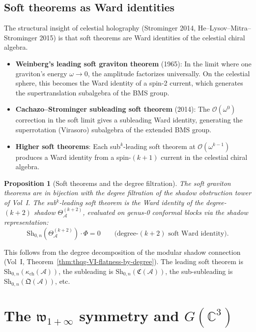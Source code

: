 \documentclass[11pt]{article}
\newtheorem{proposition}[theorem]{Proposition}
\theoremstyle{definition}
\theoremstyle{remark}
\newcommand{\cA}{\mathcal{A}}
\newcommand{\Sh}{\mathrm{Sh}}
\begin{document}
\subsection{Soft theorems as Ward identities}

The structural insight of celestial holography (Strominger 2014, He--Lysov--Mitra--Strominger 2015) is that soft theorems are Ward identities of the celestial chiral algebra.

\begin{itemize}
\item \textbf{Weinberg's leading soft graviton theorem} (1965):
 In the limit where one graviton's energy $\omega \to 0$, the
 amplitude factorizes universally. On the celestial sphere,
 this becomes the Ward identity of a spin-2 current, which
 generates the supertranslation subalgebra of the BMS group.

\item \textbf{Cachazo--Strominger subleading soft theorem} (2014):
 The $\mathcal{O}(\omega^0)$ correction in the soft limit gives
 a subleading Ward identity, generating the superrotation
 (Virasoro) subalgebra of the extended BMS group.

\item \textbf{Higher soft theorems}: Each sub$^k$-leading soft
 theorem at $\mathcal{O}(\omega^{k-1})$ produces a Ward identity
 from a spin-$(k+1)$ current in the celestial chiral algebra.
\end{itemize}

\begin{proposition}[Soft theorems and the degree filtration]
\label{prop:soft-degree}
The soft graviton theorems are in bijection with the degree
filtration of the shadow obstruction tower of Vol~I. The
sub$^k$-leading soft theorem is the Ward identity of the
degree-$(k+2)$ shadow $\Theta^{(k+2)}_\cA$, evaluated on
genus-0 conformal blocks via the shadow representation:
\[
\Sh_{0,n}(\Theta^{(k+2)}_\cA) \cdot \Phi = 0
\qquad
\text{(degree-$(k+2)$ soft Ward identity)}.
\]
\end{proposition}

This follows from the degree decomposition of the modular shadow
connection (Vol~I, Theorem~\ref*{thm:thqg-VI-flatness-by-degree}).
The leading soft theorem is $\Sh_{0,n}(\kappa_{\mathrm{ch}}(\cA))$, the
subleading is $\Sh_{0,n}(\mathfrak{C}(\cA))$, the sub-subleading
is $\Sh_{0,n}(\mathfrak{Q}(\cA))$, etc.

\section{The $\mathfrak{w}_{1+\infty}$ symmetry and $G(\mathbb{C}^3)$}
\label{sec:w-infinity-c3}
\end{document}
